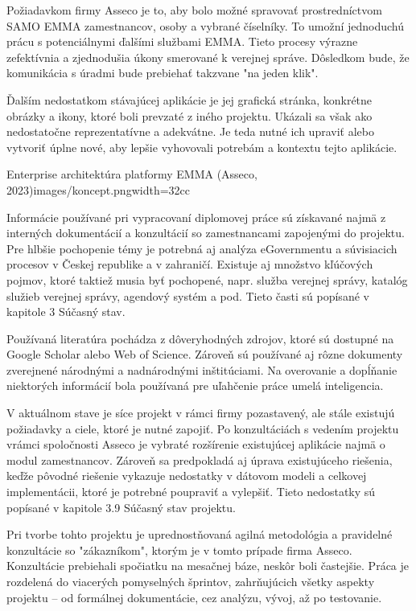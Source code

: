 Požiadavkom firmy Asseco je to, aby bolo možné spravovať prostredníctvom SAMO EMMA zamestnancov, osoby a vybrané číselníky. To umožní jednoduchú prácu s potenciálnymi ďalšími službami EMMA.  Tieto procesy výrazne zefektívnia a zjednodušia úkony smerované k verejnej správe. Dôsledkom bude, že komunikácia s úradmi bude prebiehať takzvane "na jeden klik".

Ďalším nedostatkom stávajúcej aplikácie je jej grafická stránka, konkrétne obrázky a ikony, ktoré boli prevzaté z iného projektu. Ukázali sa však ako nedostatočne reprezentatívne a adekvátne. Je teda nutné ich upraviť alebo vytvoriť úplne nové, aby lepšie vyhovovali potrebám a kontextu tejto aplikácie.


{Enterprise architektúra platformy EMMA  (Asseco, 2023)}{images/koncept.png}{width=32cc}


Informácie používané pri vypracovaní diplomovej práce sú získavané najmä z interných dokumentácií a konzultácií so zamestnancami zapojenými do projektu. Pre hlbšie pochopenie témy je potrebná aj analýza eGovernmentu a súvisiacich procesov v Českej republike a v zahraničí. Existuje aj množstvo kľúčových pojmov, ktoré taktiež musia byť pochopené, napr. služba verejnej správy, katalóg služieb verejnej správy, agendový systém a pod. Tieto časti sú popísané v kapitole 3 Súčasný stav.

Používaná literatúra pochádza z dôveryhodných zdrojov, ktoré sú dostupné na Google Scholar alebo Web of Science. Zároveň sú používané aj rôzne dokumenty zverejnené národnými a nadnárodnými inštitúciami. Na overovanie a dopĺňanie niektorých informácií bola používaná pre uľahčenie práce umelá inteligencia.

V aktuálnom stave je síce projekt v rámci firmy pozastavený, ale stále existujú požiadavky a ciele, ktoré je nutné zapojiť. Po konzultáciách s vedením projektu vrámci spoločnosti Asseco je vybraté rozšírenie existujúcej aplikácie najmä o modul zamestnancov. Zároveň sa predpokladá aj úprava existujúceho riešenia, keďže pôvodné riešenie vykazuje nedostatky v dátovom modeli a celkovej implementácii, ktoré je potrebné poupraviť a vylepšiť. Tieto nedostatky sú popísané v kapitole 3.9 Súčasný stav projektu.

Pri tvorbe tohto projektu je uprednostňovaná agilná metodológia a pravidelné konzultácie so "zákazníkom", ktorým je v tomto prípade firma Asseco. Konzultácie prebiehali spočiatku na mesačnej báze, neskôr boli častejšie. Práca je rozdelená do viacerých pomyselných šprintov, zahrňujúcich všetky aspekty projektu -- od formálnej dokumentácie, cez analýzu, vývoj, až po testovanie.

